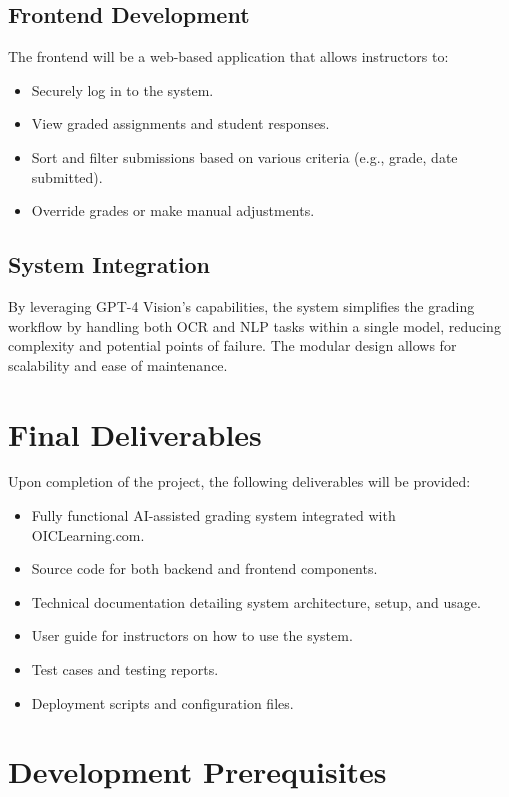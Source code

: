 \documentclass[ms,twoside,print]{nuthesis}
\begin{document}
\subsection{Frontend Development}

The frontend will be a web-based application that allows instructors to:

\begin{itemize}
    \item Securely log in to the system.
    \item View graded assignments and student responses.
    \item Sort and filter submissions based on various criteria (e.g., grade, date submitted).
    \item Override grades or make manual adjustments.
\end{itemize}

\subsection{System Integration}

By leveraging GPT-4 Vision's capabilities, the system simplifies the grading workflow by handling both OCR and NLP tasks within a single model, reducing complexity and potential points of failure. The modular design allows for scalability and ease of maintenance.

\section{Final Deliverables}

Upon completion of the project, the following deliverables will be provided:

\begin{itemize}
    \item Fully functional AI-assisted grading system integrated with OICLearning.com.
    \item Source code for both backend and frontend components.
    \item Technical documentation detailing system architecture, setup, and usage.
    \item User guide for instructors on how to use the system.
    \item Test cases and testing reports.
    \item Deployment scripts and configuration files.
\end{itemize}

\section{Development Prerequisites}
\end{document}
